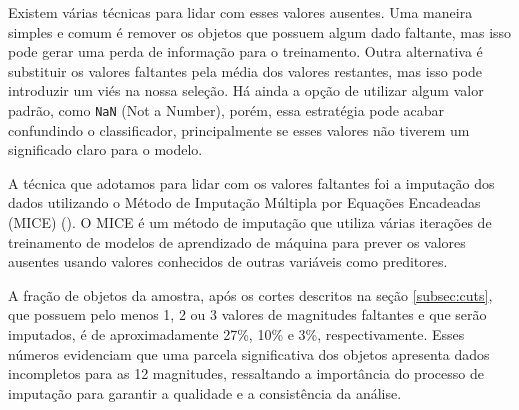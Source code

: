 


Existem várias técnicas para lidar com esses valores ausentes. Uma maneira simples e comum é remover os objetos que possuem algum dado faltante, mas isso pode gerar uma perda de informação para o treinamento. Outra alternativa é substituir os valores faltantes pela média dos valores restantes, mas isso pode introduzir um viés na nossa seleção. Há ainda a opção de utilizar algum valor padrão, como \texttt{NaN} (Not a Number), porém, essa estratégia pode acabar confundindo o classificador, principalmente se esses valores não tiverem um significado claro para o modelo.

A técnica que adotamos para lidar com os valores faltantes foi a imputação dos dados utilizando o Método de Imputação Múltipla por Equações Encadeadas (MICE) (\citealp{MICE}). O MICE é um método de imputação que utiliza várias iterações de treinamento de modelos de aprendizado de máquina para prever os valores ausentes usando valores conhecidos de outras variáveis como preditores.

A fração de objetos da amostra, após os cortes descritos na seção \ref{subsec:cuts}, que possuem pelo menos 1, 2 ou 3 valores de magnitudes faltantes e que serão imputados, é de aproximadamente 27\%, 10\% e 3\%, respectivamente. Esses números evidenciam que uma parcela significativa dos objetos apresenta dados incompletos para as 12 magnitudes, ressaltando a importância do processo de imputação para garantir a qualidade e a consistência da análise.

